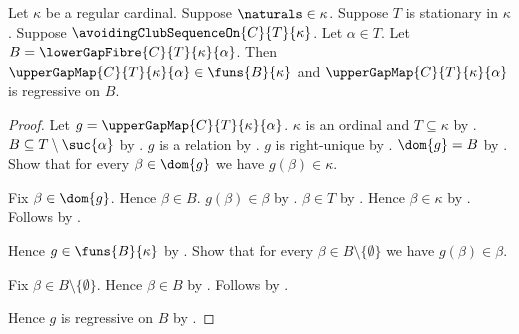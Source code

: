 \begin{theorem}\label{upper_gap_map_type_and_regressive}
    Let $\kappa$ be a regular cardinal.
    Suppose $\naturals\in\kappa$.
    Suppose $T$ is stationary in $\kappa$.
    Suppose $\avoidingClubSequenceOn{C}{T}{\kappa}$.
    Let $\alpha\in T$.
    Let $B=\lowerGapFibre{C}{T}{\kappa}{\alpha}$.
    Then $\upperGapMap{C}{T}{\kappa}{\alpha}\in\funs{B}{\kappa}$ and
        $\upperGapMap{C}{T}{\kappa}{\alpha}$ is regressive on $B$.
\end{theorem}
\begin{proof}
    Let $g=\upperGapMap{C}{T}{\kappa}{\alpha}$.
    $\kappa$ is an ordinal and $T\subseteq\kappa$
        by .
    $B\subseteq T\setminus\suc{\alpha}$
        by .
    $g$ is a relation by .
    $g$ is right-unique
        by .
    $\dom{g}=B$ by .
    Show that for every $\beta\in\dom{g}$ we have $g(\beta)\in\kappa$.
    \begin{subproof}
        Fix $\beta\in\dom{g}$.
        Hence $\beta\in B$.
        $g(\beta)\in\beta$ by .
        $\beta\in T$ by .
        Hence $\beta\in\kappa$ by .
        Follows by .
    \end{subproof}
    Hence $g\in\funs{B}{\kappa}$ by .
    Show that for every $\beta\in B\setminus\{\emptyset\}$ we have
        $g(\beta)\in\beta$.
    \begin{subproof}
        Fix $\beta\in B\setminus\{\emptyset\}$.
        Hence $\beta\in B$ by .
        Follows by .
    \end{subproof}
    Hence $g$ is regressive on $B$ by .
\end{proof}

